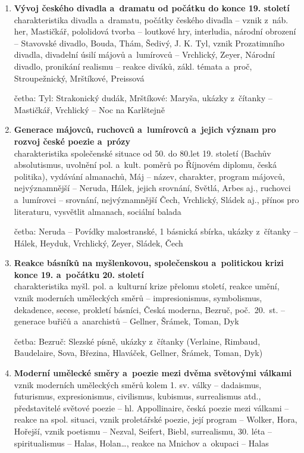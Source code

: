\begin{enumerate}
\item \textbf{Vývoj českého divadla a~dramatu od počátku do konce 19. století} \\
charakteristika divadla a~dramatu, počátky českého divadla -- vznik 
z~náb. her, Mastičkář, pololidová tvorba -- loutkové hry, interludia, 
národní obrození -- Stavovské divadlo, Bouda, Thám, Šedivý, J. K. Tyl, 
vznik Prozatimního divadla, divadelní úsilí májovů a~lumírovců --
Vrchlický, Zeyer, Národní divadlo, pronikání realismu -- reakce diváků, 
zákl. témata a~proč, Stroupežnický, Mrštíkové, Preissová

četba: Tyl: Strakonický dudák, Mrštíkové: Maryša, ukázky z~čítanky --
Mastičkář, Vrchlický -- Noc na Karlštejně 
    
\item \textbf{Generace májovců, ruchovců a~lumírovců a~jejich význam pro rozvoj české poezie a~prózy} \\
charakteristika společenské situace od 50. do 80.let 19. století
(Bachův absolutismus, uvolnění pol. a~kult. poměrů po Říjnovém diplomu, 
česká politika), vydávání almanachů, Máj -- název, charakter, program
májovců, nejvýznamnější -- Neruda, Hálek, jejich srovnání, Světlá, Arbes
aj., ruchovci a~lumírovci -- srovnání, nejvýznamnější Čech, Vrchlický, 
Sládek aj., přínos pro literaturu, vysvětlit almanach, sociální balada

četba: Neruda -- Povídky malostranské, 1 básnická sbírka, ukázky
z~čítanky -- Hálek, Heyduk, Vrchlický, Zeyer, Sládek, Čech
     
\item \textbf{Reakce básníků na myšlenkovou, společenskou a~politickou krizi konce 19. a~počátku 20. století} \\
charakteristika myšl. pol. a~kulturní krize přelomu století, reakce
umění, vznik moderních uměleckých směrů -- impresionismus, symbolismus, 
dekadence, secese, prokletí básníci, Česká moderna, Bezruč, 
poč.~20.~st. -- generace buřičů a~anarchistů -- Gellner, Šrámek, Toman, Dyk

četba: Bezruč: Slezské písně, ukázky z~čítanky (Verlaine, Rimbaud, 
Baudelaire, Sova, Březina, Hlaváček, Gellner, Šrámek, Toman, Dyk)
      
\item \textbf{Moderní umělecké směry a~poezie mezi dvěma světovými válkami} \\
vznik moderních uměleckých směrů  kolem 1. sv. války -- dadaismus, 
futurismus, expresionismus, civilismus, kubismus, surrealismus atd., 
představitelé světové poezie -- hl. Appollinaire, česká poezie mezi
válkami -- reakce na spol. situaci, vznik proletářské poezie, její
program -- Wolker, Hora,  Hořejší, vznik poetismu -- Nezval, Seifert, 
Biebl, surrealismu, 30. léta -- spiritualismus -- Halas, Holan\dots, reakce
na Mnichov a~okupaci -- Halas


\end{enumerate}

